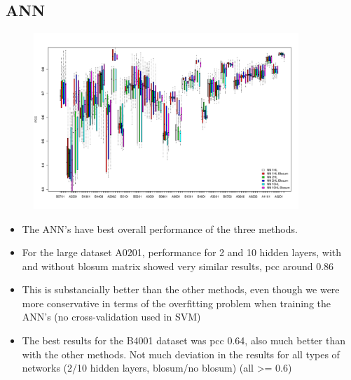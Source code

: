 \documentclass[presentation]{beamer}   %
\begin{document}
\subsection{ANN}
\begin{frame}
\begin{figure}[ht]
\begin{center}
\includegraphics[width=10cm]{fig/annBX1.pdf}
\end{center}
\end{figure}
\end{frame}

\begin{frame}
\begin{itemize}
\item<1> The ANN's have best overall performance of the three methods.
\item<2> For the large dataset A0201, performance for 2 and 10 hidden layers, with and without blosum matrix showed very similar results, pcc around 0.86
\item<3> This is substancially better than the other methods, even though we were more conservative in terms of the overfitting problem when training the ANN's (no cross-validation used in SVM)
\item<4> The best results for the B4001 dataset was pcc 0.64, also much better than with the other methods. Not much deviation in the results for all types of networks (2/10 hidden layers, blosum/no blosum) (all >= 0.6)
\end{itemize}
\end{frame}
\end{document}
